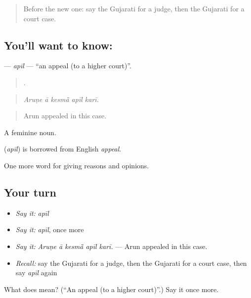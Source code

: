 \begin{quote}
Before the new one: say the Gujarati for a judge, then the Gujarati for a court case.
\end{quote}

\subsection*{You'll want to know: }
\textbf{} — \emph{apīl} — \textquotedblleft{}an appeal (to a higher court)\textquotedblright{}.

\begin{quote}
    .
\end{quote}

\begin{quote}
\emph{Aruṇe ā kesmā̃ apīl karī.}
\end{quote}

\begin{quote}
Arun appealed in this case.
\end{quote}

A feminine noun.

\begin{cousinweb}
\textbf{} (\emph{apīl}) is borrowed from English \emph{appeal}.
\end{cousinweb}

\begin{grammarlens}[title={What you've built}]
One more word for giving reasons and opinions.
\end{grammarlens}

\subsection*{Your turn}
\begin{itemize}
\raggedright
  \item \emph{Say it:} \emph{apīl}
  \item \emph{Say it:} \emph{apīl}, once more
  \item \emph{Say it:} \emph{Aruṇe ā kesmā̃ apīl karī.} — Arun appealed in this case.
  \item \emph{Recall:} say the Gujarati for a judge, then the Gujarati for a court case, then say \emph{apīl} again
\end{itemize}

\begin{tcolorbox}[breakable,colback=teal!4,colframe=teal!35!black,title={Before you move on}]
What does  mean? (\textquotedblleft{}An appeal (to a higher court)\textquotedblright{}.) Say it once more.
\end{tcolorbox}
